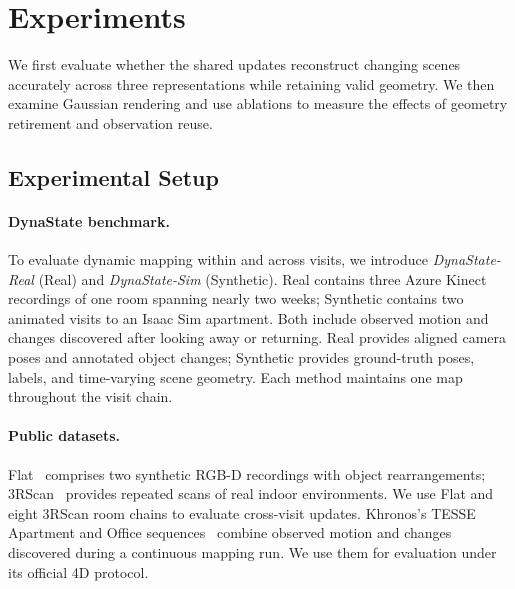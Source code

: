 \section{Experiments}
\label{sec:experiments}
\setlength{\textfloatsep}{12pt plus 2pt minus 2pt}
\setlength{\dbltextfloatsep}{12pt plus 2pt minus 2pt}
\setlength{\floatsep}{8pt plus 2pt minus 2pt}
\setlength{\dblfloatsep}{8pt plus 2pt minus 2pt}

We first evaluate whether the shared updates reconstruct changing scenes accurately across three
representations while retaining valid geometry. We then examine Gaussian rendering and use ablations
to measure the effects of geometry retirement and observation reuse.



\subsection{Experimental Setup}

\paragraph{DynaState benchmark.}
To evaluate dynamic mapping within and across visits, we introduce \emph{DynaState-Real} (Real)
and \emph{DynaState-Sim} (Synthetic). Real contains three Azure Kinect recordings of one room spanning
nearly two weeks; Synthetic contains two animated visits to an Isaac Sim apartment. Both include
observed motion and changes discovered after looking away or returning. Real provides aligned camera
poses and annotated object changes; Synthetic provides ground-truth poses, labels, and time-varying
scene geometry. Each method maintains one map throughout the visit chain.

\paragraph{Public datasets.}
Flat~\cite{schmid2022panoptic} comprises two synthetic RGB-D recordings with object rearrangements;
3RScan~\cite{wald2019rio} provides repeated scans of real indoor environments. We use Flat and eight
3RScan room chains to evaluate cross-visit updates. Khronos's TESSE Apartment and Office
sequences~\cite{schmid2024khronos} combine observed motion and changes discovered during a continuous
mapping run. We use them for evaluation under its official 4D protocol.

